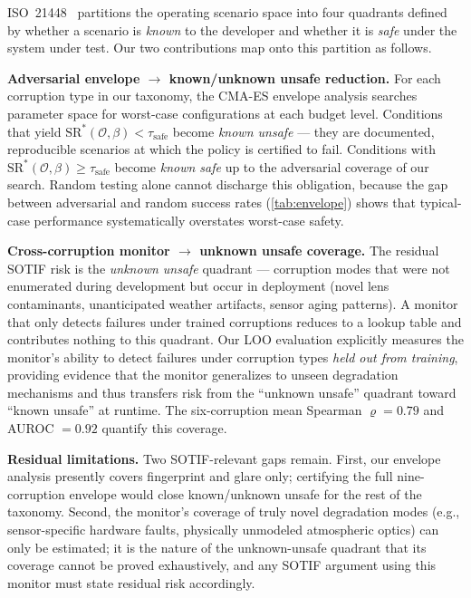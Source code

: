 \documentclass[letterpaper]{IEEEtran}
\renewcommand{\rho}{\varrho}
\begin{document}
ISO~21448~\cite{iso21448} partitions the operating scenario space into four quadrants defined by whether a scenario is \emph{known} to the developer and whether it is \emph{safe} under the system under test.
Our two contributions map onto this partition as follows.

\noindent\textbf{Adversarial envelope $\to$ known/unknown unsafe reduction.}
For each corruption type in our taxonomy, the CMA-ES envelope analysis searches parameter space for worst-case configurations at each budget level.
Conditions that yield $\text{SR}^*(\mathcal{O}, \beta) < \tau_{\text{safe}}$ become \emph{known unsafe} --- they are documented, reproducible scenarios at which the policy is certified to fail.
Conditions with $\text{SR}^*(\mathcal{O}, \beta) \geq \tau_{\text{safe}}$ become \emph{known safe} up to the adversarial coverage of our search.
Random testing alone cannot discharge this obligation, because the gap between adversarial and random success rates (\cref{tab:envelope}) shows that typical-case performance systematically overstates worst-case safety.

\noindent\textbf{Cross-corruption monitor $\to$ unknown unsafe coverage.}
The residual SOTIF risk is the \emph{unknown unsafe} quadrant --- corruption modes that were not enumerated during development but occur in deployment (novel lens contaminants, unanticipated weather artifacts, sensor aging patterns).
A monitor that only detects failures under trained corruptions reduces to a lookup table and contributes nothing to this quadrant.
Our LOO evaluation explicitly measures the monitor's ability to detect failures under corruption types \emph{held out from training}, providing evidence that the monitor generalizes to unseen degradation mechanisms and thus transfers risk from the ``unknown unsafe'' quadrant toward ``known unsafe'' at runtime.
The six-corruption mean Spearman $\rho = 0.79$ and AUROC $= 0.92$ quantify this coverage.

\noindent\textbf{Residual limitations.}
Two SOTIF-relevant gaps remain.
First, our envelope analysis presently covers fingerprint and glare only; certifying the full nine-corruption envelope would close known/unknown unsafe for the rest of the taxonomy.
Second, the monitor's coverage of truly novel degradation modes (e.g., sensor-specific hardware faults, physically unmodeled atmospheric optics) can only be estimated; it is the nature of the unknown-unsafe quadrant that its coverage cannot be proved exhaustively, and any SOTIF argument using this monitor must state residual risk accordingly.
\end{document}
